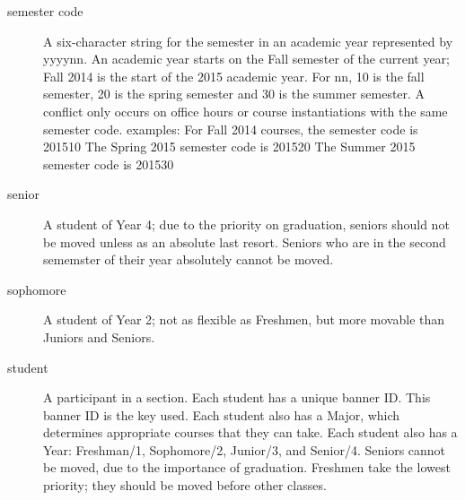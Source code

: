 \begin{description}
\item[semester code]A six-character string for the semester in an academic year represented by yyyynn.   An academic year starts on the Fall semester of the current year; Fall 2014 is the start of the 2015 academic year.  For nn, 10 is the fall semester, 20 is the spring semester and 30 is the summer semester.
A conflict only occurs on office hours or course instantiations with the same semester code.
examples:
For Fall 2014 courses, the semester code is 201510
The Spring 2015 semester code is 201520
The Summer 2015 semester code is 201530

 \item[senior]A student of Year 4; due to the priority on graduation, seniors should not be moved unless as an absolute last resort.  Seniors who are in the second sememster of their year absolutely cannot be moved.
  \item[sophomore]A student of Year 2; not as flexible as Freshmen, but more movable than Juniors and Seniors.
  \item[student] A participant in a section.  Each student has a unique banner ID.  This banner ID is the key used.  Each student also has a Major, which determines appropriate courses that they can take.  Each student also has a Year: Freshman/1, Sophomore/2, Junior/3, and Senior/4.  Seniors cannot be moved, due to the importance of graduation.  Freshmen take the lowest priority; they should be moved before other classes.
\end{description}
